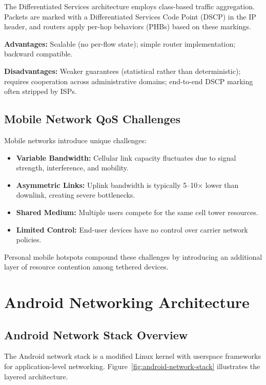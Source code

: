 The Differentiated Services architecture \cite{rfc2475} employs class-based traffic aggregation. Packets are marked with a Differentiated Services Code Point (DSCP) in the IP header, and routers apply per-hop behaviors (PHBs) based on these markings.

\textbf{Advantages:} Scalable (no per-flow state); simple router implementation; backward compatible.

\textbf{Disadvantages:} Weaker \qos guarantees (statistical rather than deterministic); requires cooperation across administrative domains; end-to-end DSCP marking often stripped by ISPs.

\subsection{Mobile Network QoS Challenges}

Mobile networks introduce unique \qos challenges:

\begin{itemize}[leftmargin=*]
    \item \textbf{Variable Bandwidth:} Cellular link capacity fluctuates due to signal strength, interference, and mobility.
    \item \textbf{Asymmetric Links:} Uplink bandwidth is typically 5–10× lower than downlink, creating severe bottlenecks.
    \item \textbf{Shared Medium:} Multiple users compete for the same cell tower resources.
    \item \textbf{Limited Control:} End-user devices have no control over carrier network \qos policies.
\end{itemize}

Personal mobile hotspots compound these challenges by introducing an additional layer of resource contention among tethered devices.

\section{Android Networking Architecture}
\label{sec:android-networking}

\subsection{Android Network Stack Overview}

The Android network stack is a modified Linux kernel with userspace frameworks for application-level networking. Figure~\ref{fig:android-network-stack} illustrates the layered architecture.

